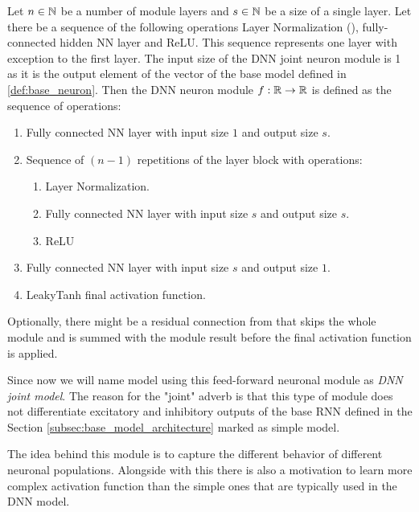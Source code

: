 \begin{defn}
    Let $n \in \mathbb{N}$ be a number of module layers and $s \in \mathbb{N}$ be a size of a single layer. Let there be a sequence of the following operations Layer Normalization (\citet{ba2016layernormalization}), fully-connected hidden NN layer and ReLU. This sequence represents one layer with exception to the first layer. The input size of the DNN joint neuron module is 1 as it is the output element of the vector of the base model defined in \ref{def:base_neuron}. Then the DNN neuron module $f: \mathbb{R} \to \mathbb{R}$ is defined as the sequence of operations:
    \begin{enumerate}
        \item Fully connected NN layer with input size $1$ and output size $s$.
        \item Sequence of $(n-1)$ repetitions of the layer block with operations:
            \begin{enumerate}
                \item Layer Normalization.
                \item Fully connected NN layer with input size $s$ and output size $s$.
                \item ReLU
            \end{enumerate}
        \item Fully connected NN layer with input size $s$ and output size $1$.
        \item LeakyTanh final activation function.
    \end{enumerate}

    Optionally, there might be a residual connection from that skips the whole module and is summed with the module result before the final activation function is applied.
\end{defn}
\label{def:dnn_joint}

Since now we will name model using this feed-forward neuronal module as \emph{DNN joint model}. The reason for the "joint" adverb is that this type of module does not differentiate excitatory and inhibitory outputs of the base RNN defined in the Section \ref{subsec:base_model_architecture} marked as simple model.

The idea behind this module is to capture the different behavior of different neuronal populations. Alongside with this there is also a motivation to learn more complex activation function than the simple ones that are typically used in the DNN model.

